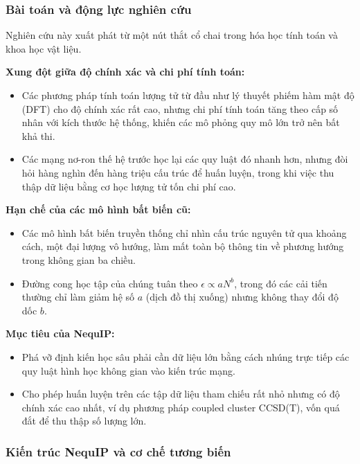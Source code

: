 \subsubsection{Bài toán và động lực nghiên cứu}

Nghiên cứu này xuất phát từ một nút thắt cổ chai trong hóa học tính toán và khoa học vật liệu.

\textbf{Xung đột giữa độ chính xác và chi phí tính toán:}
\begin{itemize}
    \item Các phương pháp tính toán lượng tử từ đầu như lý thuyết phiếm hàm mật độ (DFT) cho độ chính xác rất cao, nhưng chi phí tính toán tăng theo cấp số nhân với kích thước hệ thống, khiến các mô phỏng quy mô lớn trở nên bất khả thi.
    \item Các mạng nơ-ron thế hệ trước học lại các quy luật đó nhanh hơn, nhưng đòi hỏi hàng nghìn đến hàng triệu cấu trúc để huấn luyện, trong khi việc thu thập dữ liệu bằng cơ học lượng tử tốn chi phí cao.
\end{itemize}

\textbf{Hạn chế của các mô hình bất biến cũ:}
\begin{itemize}
    \item Các mô hình bất biến truyền thống chỉ nhìn cấu trúc nguyên tử qua khoảng cách, một đại lượng vô hướng, làm mất toàn bộ thông tin về phương hướng trong không gian ba chiều.
    \item Đường cong học tập của chúng tuân theo $\epsilon \propto aN^b$, trong đó các cải tiến thường chỉ làm giảm hệ số $a$ (dịch đồ thị xuống) nhưng không thay đổi độ dốc $b$.
\end{itemize}

\textbf{Mục tiêu của NequIP:}
\begin{itemize}
    \item Phá vỡ định kiến học sâu phải cần dữ liệu lớn bằng cách nhúng trực tiếp các quy luật hình học không gian vào kiến trúc mạng.
    \item Cho phép huấn luyện trên các tập dữ liệu tham chiếu rất nhỏ nhưng có độ chính xác cao nhất, ví dụ phương pháp coupled cluster CCSD(T), vốn quá đắt để thu thập số lượng lớn.
\end{itemize}

\subsubsection{Kiến trúc NequIP và cơ chế tương biến}

